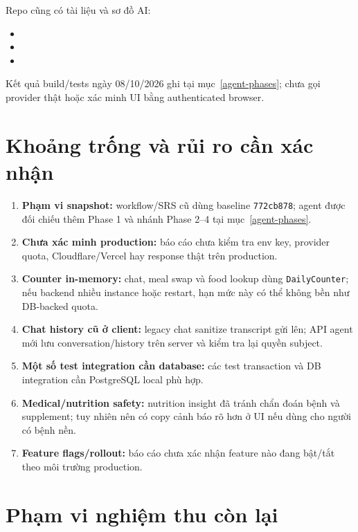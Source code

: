 \documentclass[12pt,a4paper]{article}
\newcommand{\code}[1]{\texttt{#1}}
\begin{document}
Repo cũng có tài liệu và sơ đồ AI:

\begin{itemize}
  \item {}
  \item {}
  \item {}
\end{itemize}

Kết quả build/tests ngày 08/10/2026 ghi tại mục~\ref{agent-phases}; chưa gọi provider thật hoặc xác minh UI bằng authenticated browser.

\section{Khoảng trống và rủi ro cần xác nhận}

\begin{enumerate}
  \item \textbf{Phạm vi snapshot:} workflow/SRS cũ dùng baseline \code{772cb878}; agent được đối chiếu thêm Phase 1 và nhánh Phase 2--4 tại mục~\ref{agent-phases}.
  \item \textbf{Chưa xác minh production:} báo cáo chưa kiểm tra env key, provider quota, Cloudflare/Vercel hay response thật trên production.
  \item \textbf{Counter in-memory:} chat, meal swap và food lookup dùng \code{DailyCounter}; nếu backend nhiều instance hoặc restart, hạn mức này có thể không bền như DB-backed quota.
  \item \textbf{Chat history cũ ở client:} legacy chat sanitize transcript gửi lên; API agent mới lưu conversation/history trên server và kiểm tra lại quyền subject.
  \item \textbf{Một số test integration cần database:} các test transaction và DB integration cần PostgreSQL local phù hợp.
  \item \textbf{Medical/nutrition safety:} nutrition insight đã tránh chẩn đoán bệnh và supplement; tuy nhiên nên có copy cảnh báo rõ hơn ở UI nếu dùng cho người có bệnh nền.
  \item \textbf{Feature flags/rollout:} báo cáo chưa xác nhận feature nào đang bật/tắt theo môi trường production.
\end{enumerate}

\section{Phạm vi nghiệm thu còn lại}
\end{document}
